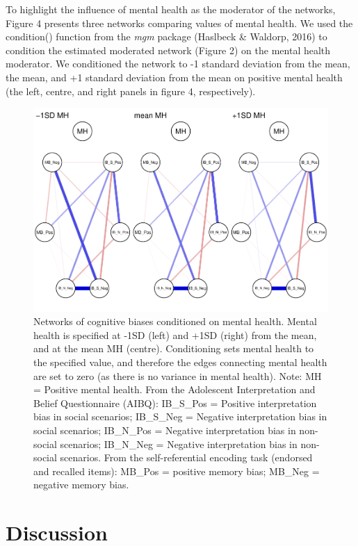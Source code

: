 \documentclass[man,floatsintext]{apa6}
\begin{document}
To highlight the influence of mental health as the moderator of the networks, Figure 4 presents three networks comparing values of mental health. We used the condition() function from the \emph{mgm} package (Haslbeck \& Waldorp, 2016) to condition the estimated moderated network (Figure 2) on the mental health moderator. We conditioned the network to -1 standard deviation from the mean, the mean, and +1 standard deviation from the mean on positive mental health (the left, centre, and right panels in figure 4, respectively).

\begin{figure}
\centering
\includegraphics{script_files/figure-latex/unnamed-chunk-5-1.pdf}
\caption{\label{fig:unnamed-chunk-5}Networks of cognitive biases conditioned on mental health. Mental health is specified at -1SD (left) and +1SD (right) from the mean, and at the mean MH (centre). Conditioning sets mental health to the specified value, and therefore the edges connecting mental health are set to zero (as there is no variance in mental health).
Note: MH = Positive mental health. From the Adolescent Interpretation and Belief Questionnaire (AIBQ): IB\_S\_Pos = Positive interpretation bias in social scenarios; IB\_S\_Neg = Negative interpretation bias in social scenarios; IB\_N\_Pos = Negative interpretation bias in non-social scenarios; IB\_N\_Neg = Negative interpretation bias in non-social scenarios. From the self-referential encoding task (endorsed and recalled items): MB\_Pos = positive memory bias; MB\_Neg = negative memory bias.}
\end{figure}

\hypertarget{discussion}{%
\section{Discussion}\label{discussion}}
\end{document}
